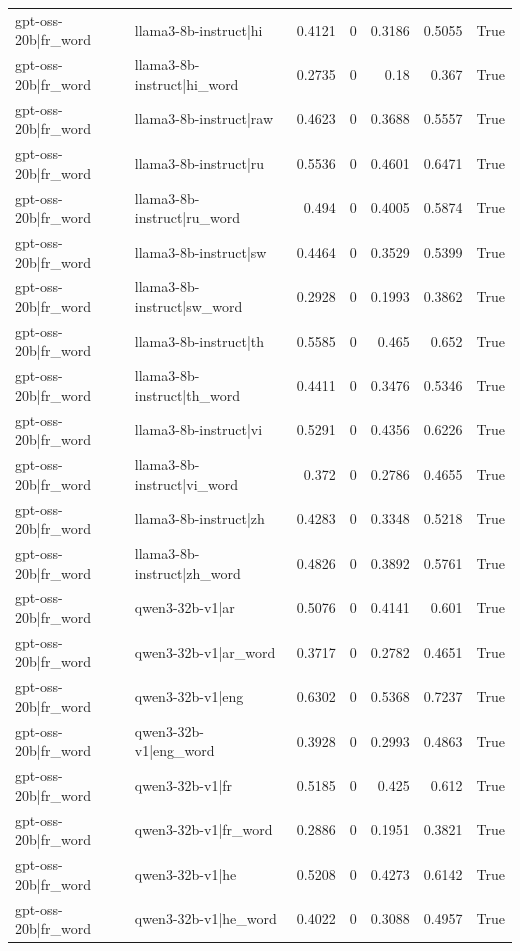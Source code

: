 \begin{table}
\begin{tabular}{l l r r r r l}
gpt-oss-20b|fr_word & llama3-8b-instruct|hi & 0.4121 & 0 & 0.3186 & 0.5055 & True \\
gpt-oss-20b|fr_word & llama3-8b-instruct|hi_word & 0.2735 & 0 & 0.18 & 0.367 & True \\
gpt-oss-20b|fr_word & llama3-8b-instruct|raw & 0.4623 & 0 & 0.3688 & 0.5557 & True \\
gpt-oss-20b|fr_word & llama3-8b-instruct|ru & 0.5536 & 0 & 0.4601 & 0.6471 & True \\
gpt-oss-20b|fr_word & llama3-8b-instruct|ru_word & 0.494 & 0 & 0.4005 & 0.5874 & True \\
gpt-oss-20b|fr_word & llama3-8b-instruct|sw & 0.4464 & 0 & 0.3529 & 0.5399 & True \\
gpt-oss-20b|fr_word & llama3-8b-instruct|sw_word & 0.2928 & 0 & 0.1993 & 0.3862 & True \\
gpt-oss-20b|fr_word & llama3-8b-instruct|th & 0.5585 & 0 & 0.465 & 0.652 & True \\
gpt-oss-20b|fr_word & llama3-8b-instruct|th_word & 0.4411 & 0 & 0.3476 & 0.5346 & True \\
gpt-oss-20b|fr_word & llama3-8b-instruct|vi & 0.5291 & 0 & 0.4356 & 0.6226 & True \\
gpt-oss-20b|fr_word & llama3-8b-instruct|vi_word & 0.372 & 0 & 0.2786 & 0.4655 & True \\
gpt-oss-20b|fr_word & llama3-8b-instruct|zh & 0.4283 & 0 & 0.3348 & 0.5218 & True \\
gpt-oss-20b|fr_word & llama3-8b-instruct|zh_word & 0.4826 & 0 & 0.3892 & 0.5761 & True \\
gpt-oss-20b|fr_word & qwen3-32b-v1|ar & 0.5076 & 0 & 0.4141 & 0.601 & True \\
gpt-oss-20b|fr_word & qwen3-32b-v1|ar_word & 0.3717 & 0 & 0.2782 & 0.4651 & True \\
gpt-oss-20b|fr_word & qwen3-32b-v1|eng & 0.6302 & 0 & 0.5368 & 0.7237 & True \\
gpt-oss-20b|fr_word & qwen3-32b-v1|eng_word & 0.3928 & 0 & 0.2993 & 0.4863 & True \\
gpt-oss-20b|fr_word & qwen3-32b-v1|fr & 0.5185 & 0 & 0.425 & 0.612 & True \\
gpt-oss-20b|fr_word & qwen3-32b-v1|fr_word & 0.2886 & 0 & 0.1951 & 0.3821 & True \\
gpt-oss-20b|fr_word & qwen3-32b-v1|he & 0.5208 & 0 & 0.4273 & 0.6142 & True \\
gpt-oss-20b|fr_word & qwen3-32b-v1|he_word & 0.4022 & 0 & 0.3088 & 0.4957 & True \\

\end{tabular}
\end{table}
